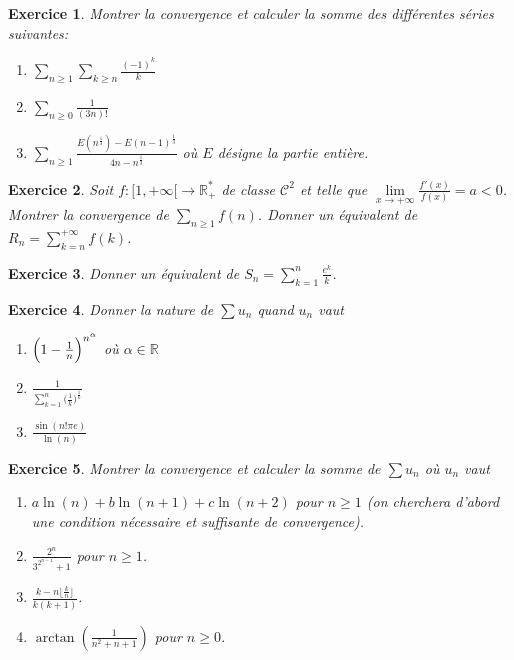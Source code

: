 \documentclass[12pt]{article}
\newtheorem{exercise}{Exercice}[section]
\theoremstyle{remark}
\theoremstyle{remark}
\newcommand{\R}{\mathbb{R}}
\begin{document}
\begin{exercise}
	Montrer la convergence et calculer la somme des différentes séries
	suivantes:
	\begin{enumerate}
		\item $\sum_{n\geqslant1}\sum_{k\geqslant n}\frac{(-1)^{k}}{k}$
		\item $\sum_{n\geqslant0}\frac{1}{(3n)!}$
		\item
		$\sum_{n\geqslant1}\frac{E(n^{\frac{1}{3}})-E(n-1)^{\frac{1}{3}}}{4n-n^{\frac{1}{3}}}$
		où $E$ désigne la partie entière.
	\end{enumerate}
\end{exercise}

\begin{exercise}
	Soit $f:[1,+\infty[\to\R_{+}^{*}$ de classe $\mathcal{C}^{2}$ et telle que
	$\lim\limits_{x\to+\infty}\frac{f'(x)}{f(x)}=a<0$. Montrer la convergence de
	$\sum_{n\geqslant1}f(n)$. Donner un équivalent de
	$R_{n}=\sum_{k=n}^{+\infty} f(k)$.
\end{exercise}

\begin{exercise}
	Donner un équivalent de $S_{n}=\sum_{k=1}^{n}\frac{e^{k}}{k}$.
\end{exercise}

\begin{exercise}
	Donner la nature de $\sum u_{n}$ quand $u_{n}$ vaut
	\begin{enumerate}
		\item $\Bigl(1-\frac{1}{n}\Bigr)^{n^{\alpha}}$ où $\alpha\in\R$
		\item $\frac{1}{\sum_{k=1}^{n}\bigl(\frac{1}{k}\bigr)^{\frac{1}{k}}}$
		\item $\frac{\sin(n!\pi e)}{\ln(n)}$
	\end{enumerate}
\end{exercise}

\begin{exercise}
	Montrer la convergence et calculer la somme de $\sum u_{n}$ où $u_{n}$ vaut
	\begin{enumerate}
		\item $a\ln(n)+b\ln(n+1)+c\ln(n+2)$ pour $n\geqslant1$ (on cherchera d'abord une condition
		nécessaire et suffisante de convergence).
		\item $\frac{2^{n}}{3^{2^{n-1}}+1}$ pour $n\geqslant 1$.
		\item $\frac{k-n\lfloor\frac{k}{n}\rfloor}{k(k+1)}$.
		\item $\arctan(\frac{1}{n^{2}+n+1})$ pour $n\geqslant0$.
	\end{enumerate}
\end{exercise}
\end{document}
